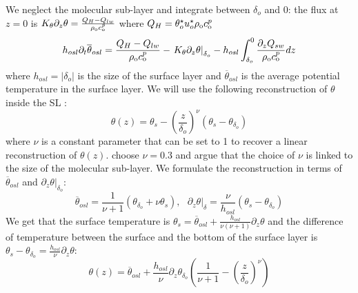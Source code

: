 \par
We neglect the molecular sub-layer and
integrate between $\delta_o$ and 0:
the flux at $z=0$ is
$K_\theta \partial_z \theta = \frac{Q_H - Q_{lw}}{\rho_{\rm o} c_{\rm o}^p}$
where $Q_H = \theta_o^\star u_o^\star \rho_{\rm o} c_{\rm o}^p$
\begin{equation}
\label{eq:evolEqOSL}
h_{osl}\partial_t \overline{\theta}_{osl} =
	\frac{Q_H - Q_{lw}}{\rho_{\rm o} c_{\rm o}^p}
- \left. K_\theta \partial_z \theta 
\right|_{\delta_{o}}
- h_{osl}\int_{\delta_o}^0
	\frac{\partial_z Q_{sw}}{\rho_{\rm o} c_{\rm o}^p} dz
\end{equation}
where $h_{osl} = |\delta_o|$
is the size of the surface layer and
$\overline{\theta}_{osl}$ is the average potential
temperature in the surface layer.
We will use the following reconstruction of $\theta$
inside the SL \citep{zeng_prognostic_2005}:
\begin{equation}
	\label{eq:ND_Ocean_reconstructionSimpleTheta}
    \theta(z) = \theta_s -
    \left(\frac{z}{\delta_{o}}\right)^\nu \left( \theta_s - 
    \theta_{\delta_o}\right)
\end{equation}
where $\nu$ is a constant parameter that can be set to 1 to
recover a linear reconstruction of $\theta(z)$.
\cite{zeng_prognostic_2005} choose $\nu=0.3$ and argue that
the choice of $\nu$ is linked to the size of the molecular
sub-layer.
We formulate the reconstruction in terms of $\overline{\theta}_{osl}$
and $\left.\partial_z \theta\right|_{\delta_o}$:
\begin{equation}
    \overline{\theta}_{osl} = \frac{1}{\nu+1}
    (\theta_{\delta_o} + \nu \theta_s)
, ~~~ \left.\partial_z \theta \right|_\delta
= \frac{\nu}{h_{osl}} (\theta_s - \theta_{\delta_o})
\end{equation}
We get that the surface temperature
is $\theta_s = \overline{\theta}_{osl}
+ \frac{h_{osl}}{\nu(\nu+1)} \partial_z \theta$ and
the difference of temperature between
the surface and the bottom of the surface layer is
$\theta_s - \theta_{\delta_o} = 
\frac{h_{osl}}{\nu}\partial_z \theta$:
\begin{equation}
    \theta(z) = \overline{\theta}_{osl} +
    \frac{h_{osl}}{\nu} \partial_z \theta_{\delta_o} \left(
    \frac{1}{\nu+1} - \left(\frac{z}{\delta_{o}}\right)^\nu
\right)
\end{equation}

